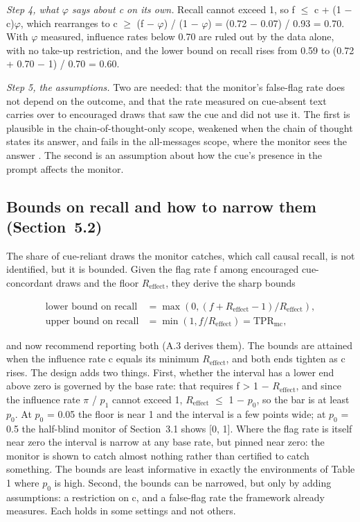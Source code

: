 \documentclass[11pt,a4paper]{article}
\begin{document}
\emph{Step 4, what $\varphi$ says about c on its own.} Recall cannot exceed 1, so f $\leq$ c + (1 $-$ c)$\varphi$, which rearranges to c $\geq$ (f $-$ $\varphi$) / (1 $-$ $\varphi$) = (0.72 $-$ 0.07) / 0.93 = 0.70. With $\varphi$ measured, influence rates below 0.70 are ruled out by the data alone, with no take-up restriction, and the lower bound on recall rises from 0.59 to (0.72 + 0.70 $-$ 1) / 0.70 = 0.60.

\emph{Step 5, the assumptions.} Two are needed: that the monitor's false-flag rate does not depend on the outcome, and that the rate measured on cue-absent text carries over to encouraged draws that saw the cue and did not use it. The first is plausible in the chain-of-thought-only scope, weakened when the chain of thought states its answer, and fails in the all-messages scope, where the monitor sees the answer \citep{imai2010causal}. The second is an assumption about how the cue's presence in the prompt affects the monitor.

\setcounter{subsection}{4}
\subsection{Bounds on recall and how to narrow them (Section~5.2)}
The share of cue-reliant draws the monitor catches, which \citet*{guan2026beyond} call causal recall, is not identified, but it is bounded. Given the flag rate f among encouraged cue-concordant draws and the floor $R_{\mathrm{effect}}$, they derive the sharp bounds

\begin{align*}
  \text{lower bound on recall} &= \max(0, (f + R_{\mathrm{effect}} - 1) / R_{\mathrm{effect}}), \\
  \text{upper bound on recall} &= \min(1, f / R_{\mathrm{effect}}) = \mathrm{TPR}_{\mathrm{mc}},
\end{align*}

and now recommend reporting both (A.3 derives them). The bounds are attained when the influence rate c equals its minimum $R_{\mathrm{effect}}$, and both ends tighten as c rises. The design adds two things. First, whether the interval has a lower end above zero is governed by the base rate: that requires f > 1 $-$ $R_{\mathrm{effect}}$, and since the influence rate $\pi$ / $p_1$ cannot exceed 1, $R_{\mathrm{effect}}$ $\leq$ 1 $-$ $p_0$, so the bar is at least $p_0$. At $p_0$ = 0.05 the floor is near 1 and the interval is a few points wide; at $p_0$ = 0.5 the half-blind monitor of Section~3.1 shows [0, 1]. Where the flag rate is itself near zero the interval is narrow at any base rate, but pinned near zero: the monitor is shown to catch almost nothing rather than certified to catch something. The bounds are least informative in exactly the environments of Table 1 where $p_0$ is high. Second, the bounds can be narrowed, but only by adding assumptions: a restriction on c, and a false-flag rate the framework already measures. Each holds in some settings and not others.
\end{document}

